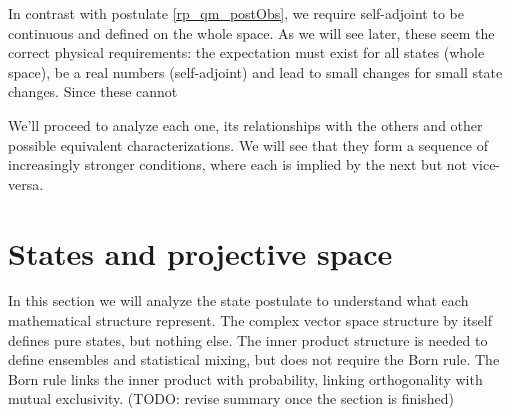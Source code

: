 In contrast with postulate \ref{rp_qm_postObs}, we require self-adjoint to be continuous and defined on the whole space. As we will see later, these seem the correct physical requirements: the expectation must exist for all states (whole space), be a real numbers (self-adjoint) and lead to small changes for small state changes. Since these cannot 

We'll proceed to analyze each one, its relationships with the others and other possible equivalent characterizations. We will see that they form a sequence of increasingly stronger conditions, where each is implied by the next but not vice-versa.

\section{States and projective space}

In this section we will analyze the state postulate to understand what each mathematical structure represent. The complex vector space structure by itself defines pure states, but nothing else. The inner product structure is needed to define ensembles and statistical mixing, but does not require the Born rule. The Born rule links the inner product with probability, linking orthogonality with mutual exclusivity. (TODO: revise summary once the section is finished)


